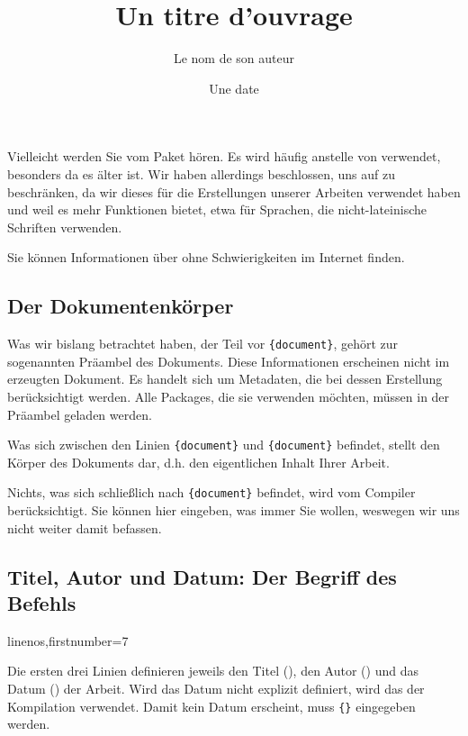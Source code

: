 \begin{plusloins}
Vielleicht werden Sie vom Paket  hören. Es wird häufig anstelle von  verwendet, besonders da es älter ist. Wir haben allerdings beschlossen, uns auf  zu beschränken, da wir dieses für die Erstellungen unserer Arbeiten verwendet haben und weil es mehr Funktionen bietet, etwa für Sprachen, die nicht-lateinische Schriften verwenden.

Sie können Informationen über  ohne Schwierigkeiten im Internet finden.
\end{plusloins}

\subsection{Der Dokumentenkörper}

Was wir bislang betrachtet haben, der Teil vor \verb|{document}|, gehört zur sogenannten Präambel des Dokuments.\label{preambule} Diese Informationen erscheinen nicht im erzeugten Dokument. Es handelt sich um Metadaten, die bei dessen Erstellung berücksichtigt werden. Alle Packages, die sie verwenden möchten, müssen in der Präambel geladen werden.

Was sich zwischen den Linien  \verb|{document}| und \verb|{document}| befindet, stellt den Körper des Dokuments dar, d.h. den eigentlichen Inhalt Ihrer Arbeit.

Nichts, was sich schließlich nach \verb|{document}| befindet, wird vom Compiler berücksichtigt. Sie können hier eingeben, was immer Sie wollen, weswegen wir uns nicht weiter damit befassen.

\subsection{Titel, Autor und Datum: Der Begriff des Befehls}\label{notioncommande}

\begin{latexcode*}{linenos,firstnumber=7}
\title{Un titre d'ouvrage}
\author{Le nom de son auteur}
\date{Une date}
\maketitle
\end{latexcode*}

Die ersten drei Linien definieren jeweils den Titel (), den Autor () und das Datum () der Arbeit. Wird das Datum nicht explizit definiert, wird das der Kompilation verwendet. Damit kein Datum erscheint, muss  \verb|{}| eingegeben werden.

